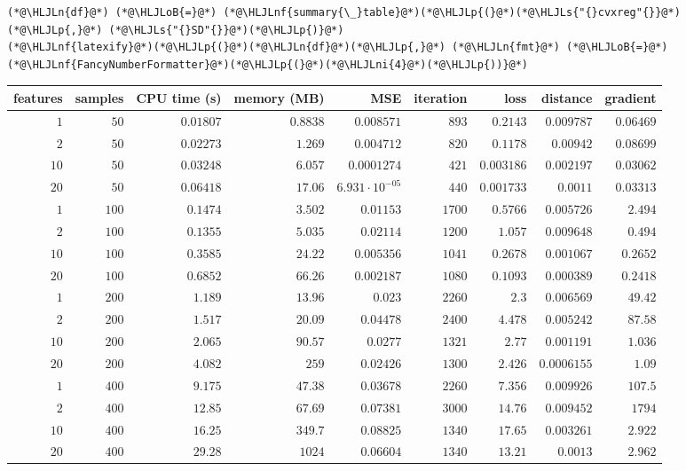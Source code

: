 \documentclass[12pt,a4paper]{article}
\newcommand{\HLJLn}[1]{#1}
\newcommand{\HLJLnf}[1]{\textcolor[RGB]{66,102,213}{#1}}
\newcommand{\HLJLs}[1]{\textcolor[RGB]{201,61,57}{#1}}
\newcommand{\HLJLni}[1]{\textcolor[RGB]{59,151,46}{#1}}
\newcommand{\HLJLoB}[1]{\textcolor[RGB]{102,102,102}{\textbf{#1}}}
\newcommand{\HLJLp}[1]{#1}
\begin{document}
\begin{lstlisting}
(*@\HLJLn{df}@*) (*@\HLJLoB{=}@*) (*@\HLJLnf{summary{\_}table}@*)(*@\HLJLp{(}@*)(*@\HLJLs{"{}cvxreg"{}}@*)(*@\HLJLp{,}@*) (*@\HLJLs{"{}SD"{}}@*)(*@\HLJLp{)}@*)
(*@\HLJLnf{latexify}@*)(*@\HLJLp{(}@*)(*@\HLJLn{df}@*)(*@\HLJLp{,}@*) (*@\HLJLn{fmt}@*) (*@\HLJLoB{=}@*) (*@\HLJLnf{FancyNumberFormatter}@*)(*@\HLJLp{(}@*)(*@\HLJLni{4}@*)(*@\HLJLp{))}@*)
\end{lstlisting}


\begin{tabular}
{r | r | r | r | r | r | r | r | r}
features & samples & CPU time (s) & memory (MB) & MSE & iteration & loss & distance & gradient \\
\hline
$1$ & $50$ & $0.01807$ & $0.8838$ & $0.008571$ & $893$ & $0.2143$ & $0.009787$ & $0.06469$ \\
$2$ & $50$ & $0.02273$ & $1.269$ & $0.004712$ & $820$ & $0.1178$ & $0.00942$ & $0.08699$ \\
$10$ & $50$ & $0.03248$ & $6.057$ & $0.0001274$ & $421$ & $0.003186$ & $0.002197$ & $0.03062$ \\
$20$ & $50$ & $0.06418$ & $17.06$ & $6.931 \cdot 10^{-05}$ & $440$ & $0.001733$ & $0.0011$ & $0.03313$ \\
$1$ & $100$ & $0.1474$ & $3.502$ & $0.01153$ & $1700$ & $0.5766$ & $0.005726$ & $2.494$ \\
$2$ & $100$ & $0.1355$ & $5.035$ & $0.02114$ & $1200$ & $1.057$ & $0.009648$ & $0.494$ \\
$10$ & $100$ & $0.3585$ & $24.22$ & $0.005356$ & $1041$ & $0.2678$ & $0.001067$ & $0.2652$ \\
$20$ & $100$ & $0.6852$ & $66.26$ & $0.002187$ & $1080$ & $0.1093$ & $0.000389$ & $0.2418$ \\
$1$ & $200$ & $1.189$ & $13.96$ & $0.023$ & $2260$ & $2.3$ & $0.006569$ & $49.42$ \\
$2$ & $200$ & $1.517$ & $20.09$ & $0.04478$ & $2400$ & $4.478$ & $0.005242$ & $87.58$ \\
$10$ & $200$ & $2.065$ & $90.57$ & $0.0277$ & $1321$ & $2.77$ & $0.001191$ & $1.036$ \\
$20$ & $200$ & $4.082$ & $259$ & $0.02426$ & $1300$ & $2.426$ & $0.0006155$ & $1.09$ \\
$1$ & $400$ & $9.175$ & $47.38$ & $0.03678$ & $2260$ & $7.356$ & $0.009926$ & $107.5$ \\
$2$ & $400$ & $12.85$ & $67.69$ & $0.07381$ & $3000$ & $14.76$ & $0.009452$ & $1794$ \\
$10$ & $400$ & $16.25$ & $349.7$ & $0.08825$ & $1340$ & $17.65$ & $0.003261$ & $2.922$ \\
$20$ & $400$ & $29.28$ & $1024$ & $0.06604$ & $1340$ & $13.21$ & $0.0013$ & $2.962$ \\
\end{tabular}
\end{document}
